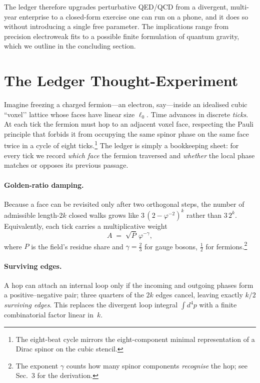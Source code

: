 \documentclass[11pt]{article}
\begin{document}
The ledger therefore upgrades perturbative QED/QCD from a divergent,
multi-year enterprise to a closed-form exercise one can run on a phone,
and it does so without introducing a single free parameter.  The
implications range from precision electroweak fits to a possible finite
formulation of quantum gravity, which we outline in the concluding
section.

\section{The Ledger Thought-Experiment}\label{sec:ledger}

Imagine freezing a charged fermion—an electron, say—inside an
idealised cubic ``voxel’’ lattice whose faces have linear size
$\ell_{0}$.  Time advances in discrete \emph{ticks}.  At each tick the
fermion must hop to an adjacent voxel face, respecting the Pauli
principle that forbids it from occupying the same spinor phase on the
same face twice in a cycle of eight ticks.\footnote{%
The eight-beat cycle mirrors the eight-component minimal representation
of a Dirac spinor on the cubic stencil.}  The ledger is simply a
bookkeeping sheet: for every tick we record \emph{which face} the
fermion traversed and \emph{whether} the local phase matches or opposes
its previous passage.

\paragraph{Golden-ratio damping.}
Because a face can be revisited only after two orthogonal steps, the
number of admissible length-$2k$ closed walks grows like
$3\,(2-\varphi^{-2})^{k}$ rather than $3\,2^{k}$.
Equivalently, each tick carries a multiplicative weight
\[
  A \;=\;\sqrt{P}\,\varphi^{-\gamma},
\]
where $P$ is the field’s residue share and
$\gamma = \tfrac23$ for gauge bosons, $\tfrac12$ for
fermions.\footnote{%
The exponent $\gamma$ counts how many spinor components \emph{recognise}
the hop; see Sec.~3 for the derivation.}

\paragraph{Surviving edges.}
A hop can attach an internal loop only if the incoming and outgoing
phases form a positive–negative pair; three quarters of the $2k$ edges
cancel, leaving exactly $k/2$ \emph{surviving edges}.  This replaces the
divergent loop integral $\int d^{4}p$ with a finite combinatorial factor
linear in~$k$.
\end{document}
